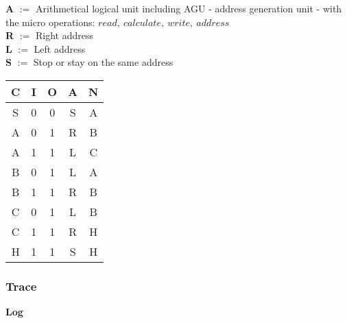 \documentclass[10pt,a4paper]{article}
\begin{document}
\vskip 8pt
{\bf A} $:=$ \rm Arithmetical logical unit including AGU
- address generation unit - with the micro operations:
$read, \ calculate,\ write,\ address$ \\
{\bf R} $:=$ Right address \\
{\bf L} $:=$ Left address \\
{\bf S} $:=$ Stop or stay on the same address

\newcommand\tb[1] {\textbf{#1}}
\newcommand\e[1] {\colorbox{amber}{\bf #1}}

\vskip 4pt
%
\begin{table}[H]
  \begin{center}
    \begin{tabular}{|c|c|c|c|c|}
      \hline
      \tb{C} & \tb{I} & \tb{O} & \tb{A} & \tb{N}\\ %
      \hline
      \hline
      S & 0 & 0 & S & A \\ %
      \hline
      A & 0 & 1 & R & B \\ %
      A & 1 & 1 & L & C \\ %
      \hline
      B & 0 & 1 & L & A \\ %
      B & 1 & 1 & R & B \\ %
      \hline
      C & 0 & 1 & L & B \\ %
      C & 1 & 1 & R & H \\ %
      \hline
      H & 1 & 1 & S & H \\ %
      \hline
    \end{tabular}
  \end{center}
\end{table}


\subsubsection{Trace}

\vskip 4pt
{\bf Log}
       
\end{document}
